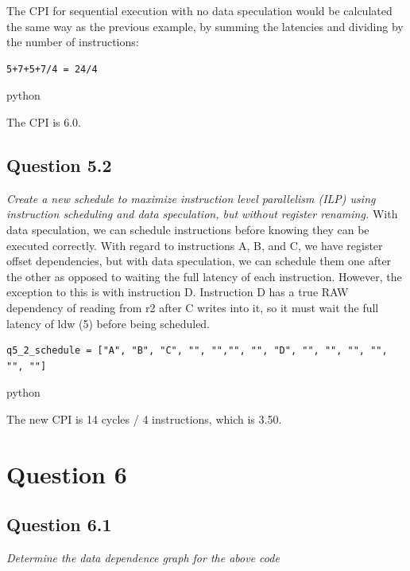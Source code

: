 \documentclass[
	letterpaper, %
]{jdf}
\begin{document}
The CPI for sequential execution with no data speculation would be calculated the same way as the previous example, by summing the latencies and dividing by the number of instructions:

\begin{verbatim}
5+7+5+7/4 = 24/4
\end{verbatim}{python}

The CPI is 6.0.

\subsection{Question 5.2}
\textit{Create a new schedule to maximize instruction level parallelism (ILP) using instruction scheduling and data speculation, but without register renaming.}
With data speculation, we can schedule instructions before knowing they can be executed correctly. With regard to instructions A, B, and C, we have register offset dependencies, but with data speculation, we can schedule them one after the other as opposed to waiting the full latency of each instruction. However, the exception to this is with instruction D. Instruction D has a true RAW dependency of reading from r2 after C writes into it, so it must wait the full latency of ldw (5) before being scheduled.

\begin{verbatim}
q5_2_schedule = ["A", "B", "C", "", "","", "", "D", "", "", "", "", "", ""]
\end{verbatim}{python}

The new CPI is 14 cycles / 4 instructions, which is 3.50.

\section{Question 6}

\subsection{Question 6.1}
\textit{Determine the data dependence graph for the above code}
\end{document}
